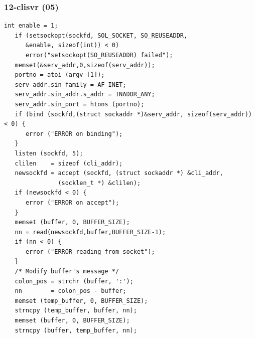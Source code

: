 \documentclass[xcolor=table, notheorems, hyperref={pdfpagelabels=false}]{beamer}
\begin{document}
\begin{frame}[fragile]
\frametitle{12-clisvr (05)}
\begin{lstlisting}[basicstyle=\ttfamily\tiny]
   int enable = 1;
   if (setsockopt(sockfd, SOL_SOCKET, SO_REUSEADDR, 
      &enable, sizeof(int)) < 0)
      error("setsockopt(SO_REUSEADDR) failed");
   memset(&serv_addr,0,sizeof(serv_addr));
   portno = atoi (argv [1]);
   serv_addr.sin_family = AF_INET;
   serv_addr.sin_addr.s_addr = INADDR_ANY;
   serv_addr.sin_port = htons (portno);
   if (bind (sockfd,(struct sockaddr *)&serv_addr, sizeof(serv_addr)) < 0) {
      error ("ERROR on binding");
   }
   listen (sockfd, 5);
   clilen    = sizeof (cli_addr);
   newsockfd = accept (sockfd, (struct sockaddr *) &cli_addr,
               (socklen_t *) &clilen);
   if (newsockfd < 0) {
      error ("ERROR on accept");
   }
   memset (buffer, 0, BUFFER_SIZE);
   nn = read(newsockfd,buffer,BUFFER_SIZE-1);
   if (nn < 0) {
      error ("ERROR reading from socket");
   }
   /* Modify buffer's message */
   colon_pos = strchr (buffer, ':');
   nn        = colon_pos - buffer;
   memset (temp_buffer, 0, BUFFER_SIZE);
   strncpy (temp_buffer, buffer, nn);
   memset (buffer, 0, BUFFER_SIZE);
   strncpy (buffer, temp_buffer, nn);

\end{lstlisting}
\end{frame}
\end{document}
